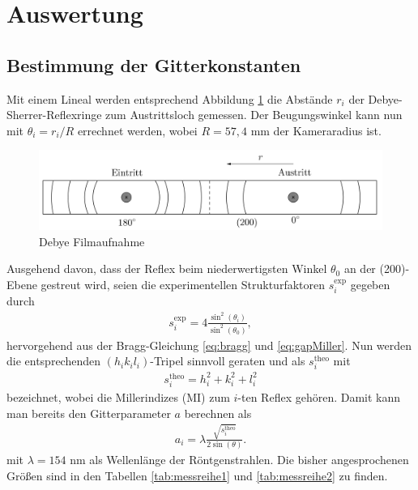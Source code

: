 \section{Auswertung}
\subsection{Bestimmung der Gitterkonstanten}
Mit einem Lineal werden entsprechend Abbildung \ref{pic:debyefilm} die Abstände $r_i$ der Debye-Sherrer-Reflexringe zum Austrittsloch gemessen. Der 
Beugungswinkel kann nun mit $\theta_i = r_i/R$ errechnet werden, wobei $R=57,4$ mm der Kameraradius ist. 
\begin{figure}[H]
 \includegraphics[width=\textwidth]{../pics/debyestreifen.jpg}
 \caption{Debye Filmaufnahme}
 \label{pic:debyefilm}
\end{figure}
\noindent Ausgehend davon, dass der Reflex beim niederwertigsten
Winkel $\theta_0$ an der (200)-Ebene gestreut wird, seien die experimentellen Strukturfaktoren $s^\text{exp}_i$ gegeben durch
\begin{align}
 s^\text{exp}_i = 4\frac{\sin^2(\theta_i)}{\sin^2(\theta_0)},
 \label{eq:structExp}
\end{align}
hervorgehend aus der Bragg-Gleichung \eqref{eq:bragg} und \eqref{eq:gapMiller}. Nun werden die entsprechenden $(h_ik_il_i)$-Tripel sinnvoll geraten und als 
$s^\text{theo}_i$ mit
\begin{align}
 s^\text{theo}_i = h_i^2 + k_i^2 + l_i^2
 \label{eq:structTheo}
\end{align}
bezeichnet, wobei die Millerindizes (MI) zum $i$-ten Reflex gehören. Damit kann man bereits den Gitterparameter $a$ berechnen als
\begin{align}
 a_i = \lambda\frac{\sqrt{s^\text{theo}_i}}{2\sin(\theta)}.
 \label{eq:gitterparameter}
\end{align}
mit $\lambda=154$ nm als Wellenlänge der Röntgenstrahlen. Die bisher angesprochenen Größen sind in den Tabellen \ref{tab:messreihe1} und \ref{tab:messreihe2} zu finden.

